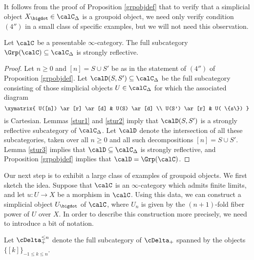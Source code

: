 \begin{remark}
It follows from the proof of Proposition \ref{grpobjdef} that to verify that a simplicial object
$X_{\bigdot} \in \calC_{\Delta}$ is a groupoid object, we need only verify condition $(4'')$
in a small class of specific examples, but we will not need this observation.
\end{remark}

\begin{proposition}\label{refle}
Let $\calC$ be a presentable $\infty$-category. The full subcategory $\Grp(\calC) \subseteq \calC_{\Delta}$ is strongly reflective.
\end{proposition}

\begin{proof}
Let $n \geq 0$ and $[n] = S \cup S'$ be as in the statement of $(4'')$ of Proposition \ref{grpobjdef}. 
Let $\calD(S,S') \subseteq \calC_{\Delta}$
be the full subcategory consisting of those simplicial objects $U \in \calC_{\Delta}$
for which the associated diagram
$$ \xymatrix{ U([n]) \ar[r] \ar[d] & U(S) \ar[d] \\
U(S') \ar[r] & U( \{s\}) }$$
is Cartesian. Lemmas \ref{stur1} and \ref{stur2} imply that $\calD(S,S')$ is a strongly reflective subcategory of $\calC_{\Delta}$. 
Let $\calD$ denote the intersection of all these subcategories, taken over all $n \geq 0$ and all such decompositions $[n] = S \cup S'$. Lemma \ref{stur3} implies that
$\calD \subseteq \calC_{\Delta}$ is strongly reflective, and Proposition \ref{grpobjdef}
implies that $\calD = \Grp(\calC)$.
\end{proof}


Our next step is to exhibit a large class of examples of groupoid objects. We first sketch the idea.
Suppose that $\calC$ is an $\infty$-category which admits finite limits, and let $u: U \rightarrow X$ be a morphism in $\calC$. Using this data, we can construct a simplicial object $U_{\bigdot}$ of $\calC$, where $U_{n}$ is given by the $(n+1)$-fold fiber power of $U$ over $X$. In order to describe this construction more precisely, we need to introduce a bit of notation.

\begin{notation}
Let $\cDelta^{\leq n}_{+}$ denote the full subcategory of $\cDelta_{+}$ spanned by the objects $\{ [k] \}_{ -1 \leq k \leq n}$.
\end{notation}


